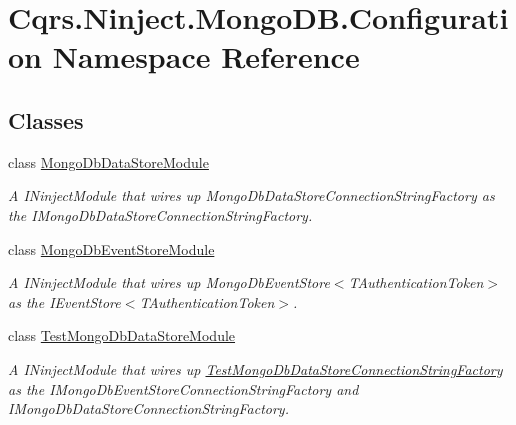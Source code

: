 \hypertarget{namespaceCqrs_1_1Ninject_1_1MongoDB_1_1Configuration}{}\section{Cqrs.\+Ninject.\+Mongo\+D\+B.\+Configuration Namespace Reference}
\label{namespaceCqrs_1_1Ninject_1_1MongoDB_1_1Configuration}
\subsection*{Classes}
\begin{DoxyCompactItemize}
\item 
class \hyperlink{classCqrs_1_1Ninject_1_1MongoDB_1_1Configuration_1_1MongoDbDataStoreModule}{Mongo\+Db\+Data\+Store\+Module}
\begin{DoxyCompactList}\small\item\em A I\+Ninject\+Module that wires up Mongo\+Db\+Data\+Store\+Connection\+String\+Factory as the I\+Mongo\+Db\+Data\+Store\+Connection\+String\+Factory. \end{DoxyCompactList}\item 
class \hyperlink{classCqrs_1_1Ninject_1_1MongoDB_1_1Configuration_1_1MongoDbEventStoreModule}{Mongo\+Db\+Event\+Store\+Module}
\begin{DoxyCompactList}\small\item\em A I\+Ninject\+Module that wires up Mongo\+Db\+Event\+Store$<$\+T\+Authentication\+Token$>$ as the I\+Event\+Store$<$\+T\+Authentication\+Token$>$. \end{DoxyCompactList}\item 
class \hyperlink{classCqrs_1_1Ninject_1_1MongoDB_1_1Configuration_1_1TestMongoDbDataStoreModule}{Test\+Mongo\+Db\+Data\+Store\+Module}
\begin{DoxyCompactList}\small\item\em A I\+Ninject\+Module that wires up \hyperlink{classCqrs_1_1Ninject_1_1MongoDB_1_1TestMongoDbDataStoreConnectionStringFactory}{Test\+Mongo\+Db\+Data\+Store\+Connection\+String\+Factory} as the I\+Mongo\+Db\+Event\+Store\+Connection\+String\+Factory and I\+Mongo\+Db\+Data\+Store\+Connection\+String\+Factory. \end{DoxyCompactList}\end{DoxyCompactItemize}
